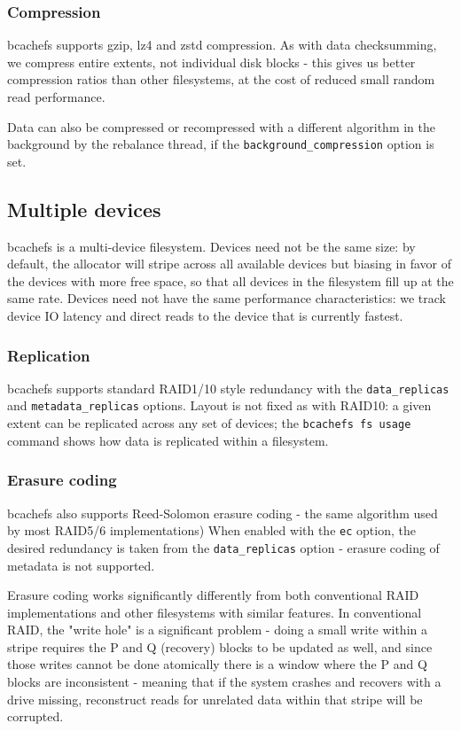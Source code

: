 \documentclass{article}
\begin{document}
\subsubsection{Compression}

bcachefs supports gzip, lz4 and zstd compression. As with data checksumming, we
compress entire extents, not individual disk blocks - this gives us better
compression ratios than other filesystems, at the cost of reduced small random
read performance.

Data can also be compressed or recompressed with a different algorithm in the
background by the rebalance thread, if the \texttt{background\_compression}
option is set.

\subsection{Multiple devices}

bcachefs is a multi-device filesystem. Devices need not be the same size: by
default, the allocator will stripe across all available devices but biasing in
favor of the devices with more free space, so that all devices in the filesystem
fill up at the same rate. Devices need not have the same performance
characteristics: we track device IO latency and direct reads to the device that
is currently fastest.

\subsubsection{Replication}

bcachefs supports standard RAID1/10 style redundancy with the
\texttt{data\_replicas} and \texttt{metadata\_replicas} options. Layout is not
fixed as with RAID10: a given extent can be replicated across any set of
devices; the \texttt{bcachefs fs usage} command shows how data is replicated
within a filesystem.

\subsubsection{Erasure coding}

bcachefs also supports Reed-Solomon erasure coding - the same algorithm used by
most RAID5/6 implementations) When enabled with the \texttt{ec} option, the
desired redundancy is taken from the \texttt{data\_replicas} option - erasure
coding of metadata is not supported.

Erasure coding works significantly differently from both conventional RAID
implementations and other filesystems with similar features. In conventional
RAID, the "write hole" is a significant problem - doing a small write within a
stripe requires the P and Q (recovery) blocks to be updated as well, and since
those writes cannot be done atomically there is a window where the P and Q
blocks are inconsistent - meaning that if the system crashes and recovers with a
drive missing, reconstruct reads for unrelated data within that stripe will be
corrupted.
\end{document}
